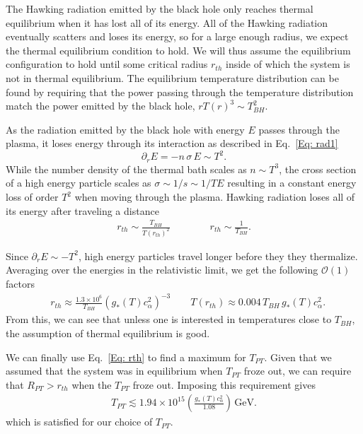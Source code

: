 \documentclass[superscriptaddress,groupedaddress,nofootnoteinbib,11pt]{article}
\newcommand\eea{\end{eqnarray}}
\newcommand\bea{\begin{eqnarray}}
\def\l{\left(}
\def\r{\right)}
\begin{document}
The Hawking radiation emitted by the black hole only reaches thermal equilibrium when it has lost all of its energy.
All of the Hawking radiation eventually scatters and loses its energy, so for a large enough radius, we expect the thermal equilibrium condition to hold.  We will thus assume the equilibrium configuration to hold until some critical radius $r_{th}$ inside of which the system is not in thermal equilibrium.
The equilibrium temperature distribution can be found by requiring that the power passing through the temperature distribution match the power emitted by the black hole, $r T(r)^3 \sim T_{BH}^2$.

As the radiation emitted by the black hole with energy $E$ passes through the plasma, it loses energy through its interaction as described in Eq.~\ref{Eq: rad1}
 \begin{equation}
     \partial_r E = -n\, \sigma \, E \sim T^2.
 \end{equation}
While the number density of the thermal bath scales as $n \sim T^3$, the cross section of a high energy particle scales as $\sigma \sim 1/s \sim 1/T E$ resulting in a constant energy loss of order $T^2$ when moving through the plasma.
Hawking radiation loses all of its energy after traveling a distance
\bea
r_{th} \sim \frac{T_{BH}}{T(r_{th})^2} \qquad \qquad r_{th} \sim \frac{1}{T_{BH}} .
\eea

Since $\partial_r E \sim -T^2$, high energy particles travel longer before they they thermalize. Averaging over the energies in the relativistic limit, we get the following $\mathcal{O}(1)$ factors
\bea\label{Eq: rth}
&r_{th}\approx \frac{ 1.3\times 10^6}{T_{BH}} \l g_*(T)c_{\alpha}^2\r^{-3} \qquad T(r_{th} ) \approx 0.004 \, T_{BH} \,  g_*(T)c_{\alpha}^2  .
\eea
From this, we can see that unless one is interested in temperatures close to $T_{BH}$, the assumption of thermal equilibrium is good.

We can finally use Eq.~\ref{Eq: rth} to find a maximum for $T_{PT}$.  Given that we assumed that the system was in equilibrium when $T_{PT}$ froze out, we can require that $R_{PT} > r_{th}$ when the $T_{PT}$ froze out.  Imposing this requirement gives
\bea
T_{PT} \lesssim 1.94\times 10^{15}\l\frac{g_*(T)c_{\alpha}^2}{1.08}\r \, \text{GeV}.
\eea
which is satisfied for our choice of $T_{PT}$.
\end{document}
